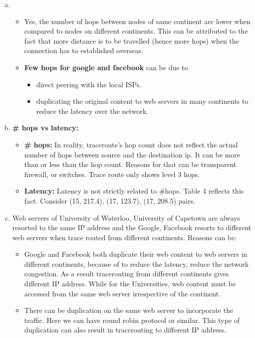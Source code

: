\documentclass{article}
\begin{document}
    \begin{enumerate}[a)]
        \item
        \begin{itemize}
            \item Yes, the number of hops between nodes of same continent are lower when compared to nodes on different continents. This can be attributed to the fact that more distance is to be travelled (hence more hops) when the connection has to established overseas. 
            \item \textbf{Few hops for google and facebook} can be due to
            \begin{itemize}
                \item direct peering with the local ISPs.
                \item duplicating the original content to web servers in many continents to reduce the latency over the network.
            \end{itemize}{}
        \end{itemize}{}
        \item \textbf{\# hops vs latency:}
            \begin{itemize}
                \item \textbf{\# hops: } In reality, traceroute's hop count does not reflect the actual number of hops between source and the destination ip. It can be more than or less than the hop count. Reasons for that can be transparent firewall,  or switches. Trace route only shows level 3 hops.
                \item \textbf{Latency: } Latency is not strictly related to \#hops. Table 4 reflects this fact. Consider (15, 217.4), (17, 123.7), (17, 208.5) pairs.
            \end{itemize}{}
        \item Web servers of University of Waterloo, University of Capetown are always resorted to the same IP address and the Google, Facebook resorts to different web servers when trace routed from different continents. Reasons can be:
        \begin{itemize}
            \item Google and Facebook both duplicate their web content to web servers in different continents, because of to reduce the latency, reduce the network congestion. As a result tracerouting from different continents gives different IP address. While for the Universities, web content must be accessed from the same web server irrespective of the continent.
            \item There can be duplication on the same web server to incorporate the traffic. Here we can have round robin protocol or similar. This type of duplication can also result in tracerouting to different IP address. 

\end{itemize}
\end{enumerate}
\end{document}
